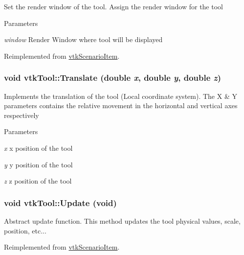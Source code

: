 Set the render window of the tool. Assign the render window for the tool 
\begin{DoxyParams}{Parameters}
\item[{\em window}]Render Window where tool will be displayed \end{DoxyParams}


Reimplemented from \hyperlink{classvtkScenarioItem_a3ce404404d36c342b947f29fa02b6170}{vtkScenarioItem}.\hypertarget{classvtkTool_a4749077c4b6e05d9dc965a94c0ca14a0}{
\subsubsection[{Translate}]{\setlength{\rightskip}{0pt plus 5cm}void vtkTool::Translate (double {\em x}, \/  double {\em y}, \/  double {\em z})}}
\label{classvtkTool_a4749077c4b6e05d9dc965a94c0ca14a0}


Implements the translation of the tool (Local coordinate system). The X \& Y parameters contains the relative movement in the horizontal and vertical axes respectively 
\begin{DoxyParams}{Parameters}
\item[{\em x}]x position of the tool \item[{\em y}]y position of the tool \item[{\em z}]z position of the tool \end{DoxyParams}
\hypertarget{classvtkTool_a0f1b6e049d7ff5420f4f4604434a9da7}{
\subsubsection[{Update}]{\setlength{\rightskip}{0pt plus 5cm}void vtkTool::Update (void)}}
\label{classvtkTool_a0f1b6e049d7ff5420f4f4604434a9da7}


Abstract update function. This method updates the tool physical values, scale, position, etc... 

Reimplemented from \hyperlink{classvtkScenarioItem_ad29b7f2958399100f919b4eb9627fbc1}{vtkScenarioItem}.

